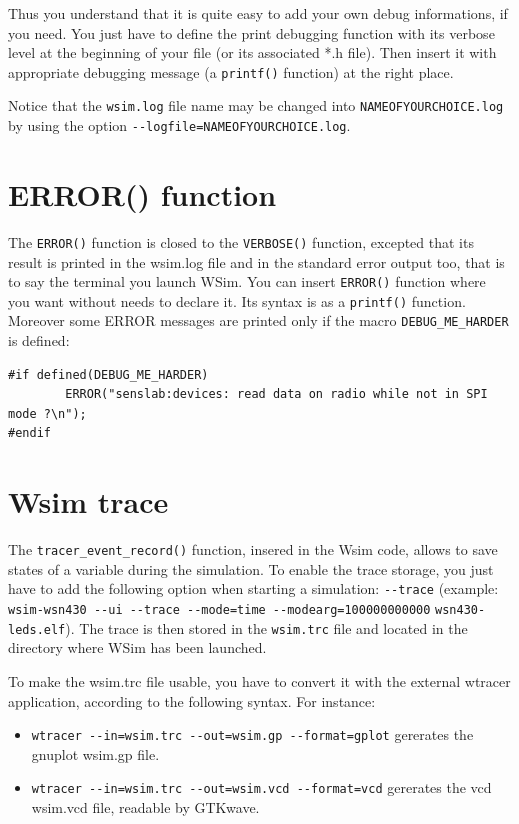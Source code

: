 \documentclass[a4paper,10pt]{report}
\begin{document}
Thus you understand that it is quite easy to add your own debug informations, if you need. You just have to define the print debugging function with its verbose level at the beginning of your file (or its associated *.h file). Then insert it with appropriate debugging message (a \verb$printf()$ function) at the right place.

Notice that the \verb$wsim.log$ file name may be changed into \verb$NAMEOFYOURCHOICE.log$ by using the option \verb$--logfile=NAMEOFYOURCHOICE.log$.

\section{ERROR() function}
The \verb$ERROR()$ function is closed to the \verb$VERBOSE()$ function, excepted that its result is printed in the wsim.log file and in the standard error output too, that is to say the terminal you launch WSim.
You can insert \verb$ERROR()$ function where you want without needs to declare it. Its syntax is as a \verb$printf()$ function.
Moreover some ERROR messages are printed only if the macro \verb$DEBUG_ME_HARDER$ is defined:
\begin{verbatim}
#if defined(DEBUG_ME_HARDER)
	    ERROR("senslab:devices: read data on radio while not in SPI mode ?\n");
#endif
\end{verbatim}

\section{Wsim trace}
The \verb$tracer_event_record()$ function, insered in the Wsim code, allows to save states of a variable during the simulation. To enable the trace storage, you just have to add the following option when starting a simulation: \verb$--trace$ (example: \verb$wsim-wsn430 --ui --trace --mode=time --modearg=100000000000$ \verb$wsn430-leds.elf$). The trace is then stored in the \verb$wsim.trc$ file and located in the  directory where WSim has been launched.

To make the wsim.trc file usable, you have to convert it with the external wtracer application, according to the following syntax. For instance:
\begin{itemize}
  \item\verb$wtracer --in=wsim.trc --out=wsim.gp --format=gplot$ gererates the gnuplot wsim.gp file. 
  \item\verb$wtracer --in=wsim.trc --out=wsim.vcd --format=vcd$ gererates the vcd wsim.vcd file, readable by GTKwave.
\end{itemize}
\end{document}
